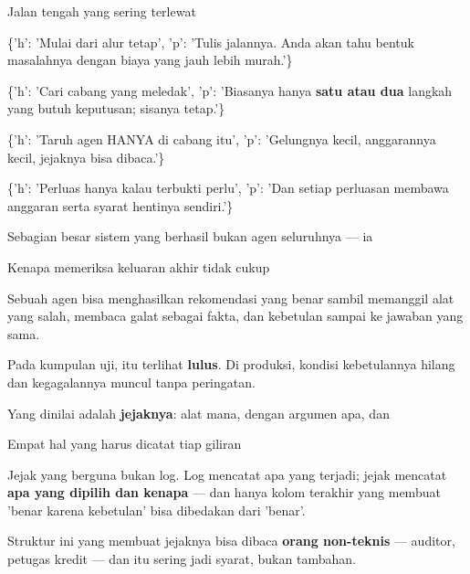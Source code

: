 \documentclass[aspectratio=169,11pt,t]{beamer}
\begin{document}
\begin{frame}[shrink=25]{Jalan tengah yang sering terlewat}
\begin{isteps}
\item \{'h': 'Mulai dari alur tetap', 'p': 'Tulis jalannya. Anda akan tahu bentuk masalahnya dengan biaya yang jauh lebih murah.'\}
\item \{'h': 'Cari cabang yang meledak', 'p': 'Biasanya hanya \textbf{satu atau dua} langkah yang butuh keputusan; sisanya tetap.'\}
\item \{'h': 'Taruh agen HANYA di cabang itu', 'p': 'Gelungnya kecil, anggarannya kecil, jejaknya bisa dibaca.'\}
\item \{'h': 'Perluas hanya kalau terbukti perlu', 'p': 'Dan setiap perluasan membawa anggaran serta syarat hentinya sendiri.'\}
\end{isteps}
\begin{iband}[signal]
Sebagian besar sistem yang berhasil bukan agen seluruhnya --- ia 
\end{iband}
\end{frame}


\begin{frame}[shrink=25]{Kenapa memeriksa keluaran akhir tidak cukup}
{\fontsize{9.4}{12.6}\selectfont\color{fg2}Sebuah agen bisa menghasilkan rekomendasi yang benar sambil memanggil alat yang salah, membaca galat sebagai fakta, dan kebetulan sampai ke jawaban yang sama.\par}\vskip 4pt
{\fontsize{9.4}{12.6}\selectfont\color{fg2}Pada kumpulan uji, itu terlihat \textbf{lulus}. Di produksi, kondisi kebetulannya hilang dan kegagalannya muncul tanpa peringatan.\par}\vskip 4pt
\begin{iband}[signal]
Yang dinilai adalah \textbf{jejaknya}: alat mana, dengan argumen apa, dan 
\end{iband}
\end{frame}

\begin{frame}[shrink=25]{Empat hal yang harus dicatat tiap giliran}
{\fontsize{9.4}{12.6}\selectfont\color{fg2}Jejak yang berguna bukan log. Log mencatat apa yang terjadi; jejak mencatat \textbf{apa yang dipilih dan kenapa} --- dan hanya kolom terakhir yang membuat 'benar karena kebetulan' bisa dibedakan dari 'benar'.\par}\vskip 4pt
{\fontsize{9.4}{12.6}\selectfont\color{fg2}Struktur ini yang membuat jejaknya bisa dibaca \textbf{orang non-teknis} --- auditor, petugas kredit --- dan itu sering jadi syarat, bukan tambahan.\par}\vskip 4pt
\end{frame}
\end{document}
